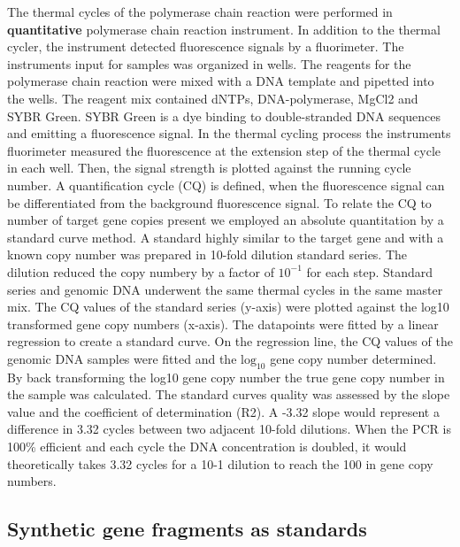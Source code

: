 \documentclass[twoside,12pt,final]{ucthesis-CA2012}
\begin{document}
\begin{ucmainmatter}
The thermal cycles of the polymerase chain reaction were performed in \textbf{quantitative} polymerase chain reaction instrument. In addition to the thermal cycler, the instrument detected fluorescence signals by a fluorimeter. The instruments input for samples was organized in wells. The reagents for the polymerase chain reaction were mixed with a DNA template and pipetted into the wells. The reagent mix contained dNTPs, DNA-polymerase, MgCl2 and SYBR Green. SYBR Green is a dye binding to double-stranded DNA sequences and emitting a fluorescence signal. In the thermal cycling process the instruments fluorimeter measured the fluorescence at the extension step of the thermal cycle in each well. Then, the signal strength is plotted against the running cycle number. A quantification cycle (CQ) is defined, when the fluorescence signal can be differentiated from the background fluorescence signal. To relate the CQ to number of target gene copies present we employed an absolute quantitation by a standard curve method. A standard highly similar to the target gene and with a known copy number was prepared in 10-fold dilution standard series. The dilution reduced the copy numbery by a factor of \(\mathrm{10^{-1}}\) for each step. Standard series and genomic DNA underwent the same thermal cycles in the same master mix. The CQ values of the standard series (y-axis) were plotted against the log10 transformed gene copy numbers (x-axis). The datapoints were fitted by a linear regression to create a standard curve. On the regression line, the CQ values of the genomic DNA samples were fitted and the \(\mathrm{log_{10}}\) gene copy number determined. By back transforming the log10 gene copy number the true gene copy number in the sample was calculated. The standard curves quality was assessed by the slope value and the coefficient of determination (R2). A -3.32 slope would represent a difference in 3.32 cycles between two adjacent 10-fold dilutions. When the PCR is 100\% efficient and each cycle the DNA concentration is doubled, it would theoretically takes 3.32 cycles for a 10-1 dilution to reach the 100 in gene copy numbers.

\hypertarget{synthetic-gene-fragments-as-standards}{%
\subsection{Synthetic gene fragments as standards}\label{synthetic-gene-fragments-as-standards}}


\end{ucmainmatter}
\end{document}
